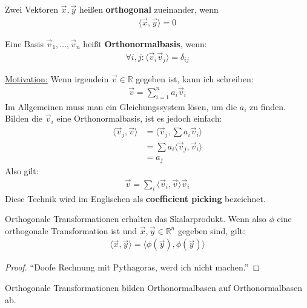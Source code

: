 \documentclass{report}
\newcommand*{\newpar}{\par\vspace{\baselineskip}\noindent}
\newcommand{\tbf}[1]{\textbf{#1}}
\newcommand{\ul}[1]{\underline{#1}}
\newcommand{\bR}{\mathbb{R}}
\newcommand{\vv}{\vec{v}}
\newcommand{\vx}{\vec{x}}
\newcommand{\vy}{\vec{y}}
\newcommand{\scalar}[2]{\langle #1, #2 \rangle}
\begin{document}
\begin{definition}
 Zwei Vektoren $\vx, \vy$ heißen \tbf{orthogonal} zueinander, wenn 
 \begin{align*}
  \langle \vx, \vy \rangle = 0
 \end{align*}
\end{definition}
\begin{definition}
 Eine Basis $\vv_1, \hdots, \vv_n$ heißt \tbf{Orthonormalbasis}, wenn:
 \begin{align*}
   \forall i,j : \langle \vv_i \vv_j \rangle = \delta_{ij}
 \end{align*}
\end{definition}
\newpar
\ul{Motivation:}
Wenn irgendein $\vv \in \bR$ gegeben ist, kann ich schreiben:
\begin{align*}
 \vv = \sum_{i = 1}^n a_i \vv_i
\end{align*}
Im Allgemeinen muss man ein Gleichungssystem lösen, um die $a_i$ zu finden. Bilden die $\vv_i$ eine Orthonormalbasis, ist es jedoch einfach:
\begin{align*}
  \scalar{\vv_j}{\vv} &= \scalar{\vv_j}{\sum a_i \vv_i}\\
                      &= \sum a_i \scalar{\vv_j}{\vv_i}\\
                      &= a_j
\end{align*}
Also gilt:
\begin{align*}
 \vv = \sum_i \scalar{\vv_i}{\vv} \vv_i
\end{align*}
Diese Technik wird im Englischen als \tbf{coefficient picking} bezeichnet.
\begin{theorem}
 Orthogonale Transformationen erhalten das Skalarprodukt. Wenn also $\phi$ eine orthogonale Transformation ist und $\vx, \vy \in \bR^n$ gegeben sind, gilt:
 \begin{align*}
  \scalar{\vx}{\vy} = \scalar{\phi(\vy)}{\phi(\vy)}
 \end{align*}
\end{theorem}
\begin{proof}
 ``Doofe Rechnung mit Pythagoras, werd ich nicht machen.''
\end{proof}
\begin{konsequenz}
 \label{orthotransbasis}
 Orthogonale Transformationen bilden Orthonormalbasen auf Orthonormalbasen ab.
\end{konsequenz}
\end{document}
